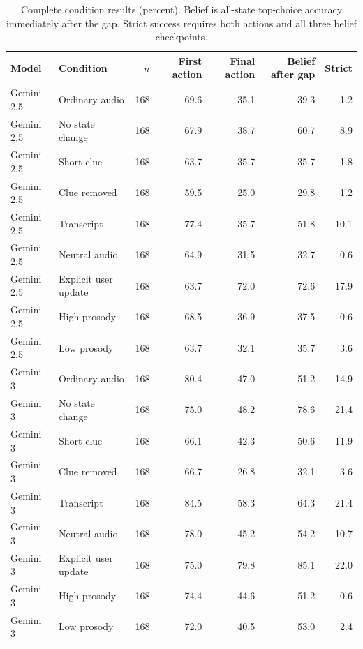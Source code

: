 \documentclass{article}
\newcommand{\dualcolhead}[1]{\textbf{#1}}
\begin{document}
\begin{table}[htbp]
  \centering
  \scriptsize
  \setlength{\tabcolsep}{5pt}
  \renewcommand{\arraystretch}{1.04}
  \caption{Complete condition results (percent). Belief is all-state top-choice accuracy immediately after the gap. Strict success requires both actions and all three belief checkpoints.}
  \label{tab:all-results}
  \begin{tabular}{@{}llrrrrr@{}}
    \toprule
    \dualcolhead{Model} & \dualcolhead{Condition} & \dualcolhead{$n$} & \dualcolhead{First action} & \dualcolhead{Final action} & \dualcolhead{Belief after gap} & \dualcolhead{Strict} \\
    \midrule
    Gemini 2.5 & Ordinary audio & 168 & 69.6 & 35.1 & 39.3 & 1.2 \\
    Gemini 2.5 & No state change & 168 & 67.9 & 38.7 & 60.7 & 8.9 \\
    Gemini 2.5 & Short clue & 168 & 63.7 & 35.7 & 35.7 & 1.8 \\
    Gemini 2.5 & Clue removed & 168 & 59.5 & 25.0 & 29.8 & 1.2 \\
    Gemini 2.5 & Transcript & 168 & 77.4 & 35.7 & 51.8 & 10.1 \\
    Gemini 2.5 & Neutral audio & 168 & 64.9 & 31.5 & 32.7 & 0.6 \\
    Gemini 2.5 & Explicit user update & 168 & 63.7 & 72.0 & 72.6 & 17.9 \\
    Gemini 2.5 & High prosody & 168 & 68.5 & 36.9 & 37.5 & 0.6 \\
    Gemini 2.5 & Low prosody & 168 & 63.7 & 32.1 & 35.7 & 3.6 \\
    \addlinespace
    Gemini 3 & Ordinary audio & 168 & 80.4 & 47.0 & 51.2 & 14.9 \\
    Gemini 3 & No state change & 168 & 75.0 & 48.2 & 78.6 & 21.4 \\
    Gemini 3 & Short clue & 168 & 66.1 & 42.3 & 50.6 & 11.9 \\
    Gemini 3 & Clue removed & 168 & 66.7 & 26.8 & 32.1 & 3.6 \\
    Gemini 3 & Transcript & 168 & 84.5 & 58.3 & 64.3 & 21.4 \\
    Gemini 3 & Neutral audio & 168 & 78.0 & 45.2 & 54.2 & 10.7 \\
    Gemini 3 & Explicit user update & 168 & 75.0 & 79.8 & 85.1 & 22.0 \\
    Gemini 3 & High prosody & 168 & 74.4 & 44.6 & 51.2 & 0.6 \\
    Gemini 3 & Low prosody & 168 & 72.0 & 40.5 & 53.0 & 2.4 \\

\end{tabular}
\end{table}
\end{document}
